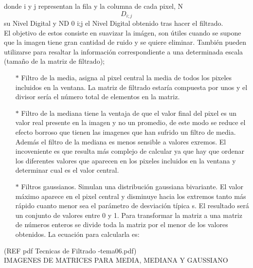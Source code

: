 donde i y j representan la fila y la columna de cada pixel, N \[D_{i;j}\] su Nivel Digital y ND 0 i;j el Nivel Digital obtenido tras hacer el filtrado.\\

El objetivo de estos consiste en suavizar la im\'agen, son útiles cuando se supone que la imagen tiene gran cantidad de ruido y se quiere eliminar. También pueden utilizarse para resaltar la información correspondiente a una determinada escala (tamaño de la matriz de filtrado); 


\begin{itemize}
	\item[$*$] Filtro de la media, asigna al pixel central la media de todos los pixeles incluidos en la ventana. La matriz de filtrado estaría compuesta por unos y el divisor sería el número total de elementos en la matriz.					\item[$*$] Filtro de la mediana tiene la ventaja de que el valor final del pixel es un valor real presente en la imagen y no un promedio, de este modo se reduce el efecto borroso que tienen las imagenes que han sufrido un filtro de media. Además el filtro de la mediana es menos sensible a valores exremos. El incoveniente es que resulta más complejo de calcular ya que hay que ordenar los diferentes valores que aparecen en los pixeles incluidos en la ventana y determinar cual es el valor central.
	\item[$*$]Filtros gaussianos. Simulan una distribución gaussiana bivariante. El valor máximo aparece en el pixel central y disminuye hacia los extremos tanto más rápido cuanto menor sea el parámetro de desviación típica s. El resultado será un conjunto de valores entre 0 y 1. Para transformar la matriz a una matriz de números enteros se divide toda la matriz por el menor de los valores obtenidos. La ecuación para calcularla es:
\end{itemize}

(REF pdf Tecnicas de Filtrado -tema06.pdf)\\

IMAGENES DE MATRICES PARA MEDIA, MEDIANA Y GAUSSIANO\\




